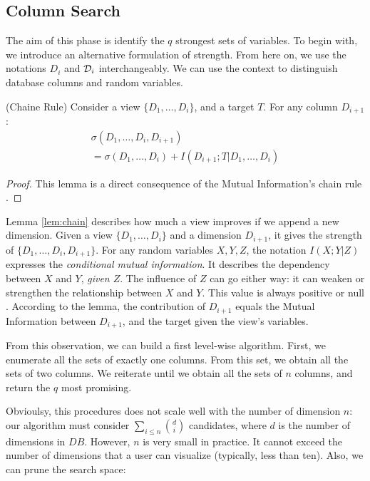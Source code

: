 \subsection{Column Search}
\label{sec:colum}
The aim of this phase is identify the $q$ strongest sets of variables. To begin
with, we introduce an alternative formulation of strength. From here on, we use
the notations $D_i$ and $\mathcal{D}_i$ interchangeably. We can use the context to
distinguish database columns and random variables.

\begin{lemma}\label{lem:chain}
(Chaine Rule) Consider a view $\{D_1, \ldots, D_i\}$, and a target $T$.
For any column $D_{i+1}$: 
\begin{multline*}
    \sigma(D_1 , \ldots, D_i , D_{i+1}) \\= \sigma(D_1 , \ldots, D_i)
                + I(D_{i+1} ; T | D_1 , \ldots, D_i)
\end{multline*}
\end{lemma}
\begin{proof}
This lemma is a direct consequence of the Mutual Information's chain rule
\cite{cover2012elements}.
\end{proof}

 Lemma \ref{lem:chain} describes how much a view improves if we append a new
dimension. Given a view $\{D_1, \ldots, D_i\}$ and a dimension $D_{i+1}$, it
gives the strength of $\{D_1, \ldots, D_i, D_{i+1}\}$.  For any random
variables $X,Y,Z$, the notation $I(X;Y|Z)$ expresses the \emph{conditional
mutual information}. It describes the dependency between $X$ and $Y$,
\emph{given $Z$}. The influence of $Z$ can go either way: it can weaken or
strengthen the relationship between $X$ and $Y$. This value is always positive
or null \cite{cover2012elements}.  According to the lemma, the contribution of
$D_{i+1}$ equals the Mutual Information between $D_{i+1}$, and the target given
the view's variables. 

From this observation, we can build a first level-wise algorithm. First, we
enumerate all the sets of exactly one columns. From this set, we obtain all the
sets of two columns. We reiterate until we obtain all the sets of $n$ columns,
and return the $q$ most promising.

Obvioulsy, this procedures does not scale well with the number of dimension
$n$: our algorithm must consider $\sum_{i \leq n} \binom{d}{i}$ candidates,
where $d$ is the number of dimensions in $DB$.  However, $n$ is very small in
practice. It cannot exceed the number of dimensions that a user can visualize
(typically, less than ten).  Also, we can prune the search space:

